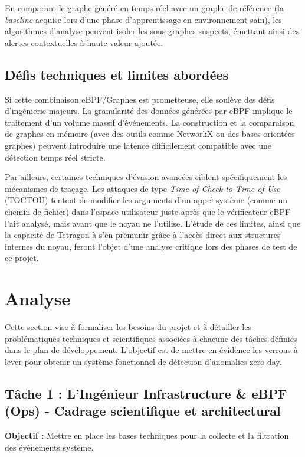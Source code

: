 \documentclass[a4paper,12pt]{article}
\begin{document}
En comparant le graphe généré en temps réel avec un graphe de référence (la \textit{baseline} acquise lors d'une phase d'apprentissage en environnement sain), les algorithmes d'analyse peuvent isoler les sous-graphes suspects, émettant ainsi des alertes contextuelles à haute valeur ajoutée.

\subsection{Défis techniques et limites abordées}
Si cette combinaison eBPF/Graphes est prometteuse, elle soulève des défis d'ingénierie majeurs. La granularité des données générées par eBPF implique le traitement d'un volume massif d'événements. La construction et la comparaison de graphes en mémoire (avec des outils comme NetworkX ou des bases orientées graphes) peuvent introduire une latence difficilement compatible avec une détection temps réel stricte.

Par ailleurs, certaines techniques d'évasion avancées ciblent spécifiquement les mécanismes de traçage. Les attaques de type \textit{Time-of-Check to Time-of-Use} (TOCTOU) tentent de modifier les arguments d'un appel système (comme un chemin de fichier) dans l'espace utilisateur juste après que le vérificateur eBPF l'ait analysé, mais avant que le noyau ne l'utilise. L'étude de ces limites, ainsi que la capacité de Tetragon à s'en prémunir grâce à l'accès direct aux structures internes du noyau, feront l'objet d'une analyse critique lors des phases de test de ce projet.




\section{Analyse}

Cette section vise à formaliser les besoins du projet et à détailler les problématiques techniques et scientifiques associées à chacune des tâches définies dans le plan de développement. L'objectif est de mettre en évidence les verrous à lever pour obtenir un système fonctionnel de détection d’anomalies zero-day.

\subsection{Tâche 1 : L'Ingénieur Infrastructure \& eBPF (Ops) - Cadrage scientifique et architectural}

\textbf{Objectif :} Mettre en place les bases techniques pour la collecte et la filtration des événements système.
\end{document}
